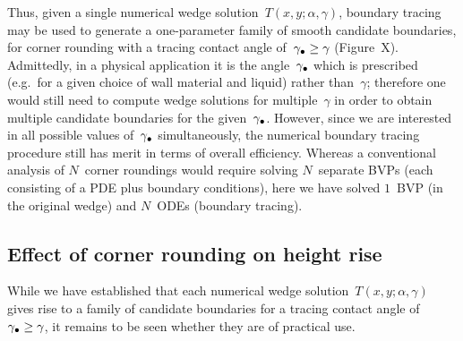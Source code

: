 Thus, given a single numerical wedge solution~$T (x, y; \alpha, \gamma)$,
boundary tracing may be used to generate a one-parameter family
of smooth candidate boundaries,
for corner rounding
with a tracing contact angle of~$\gamma_\bullet \ge \gamma$
(Figure~X). %
Admittedly, in a physical application
it is the angle~$\gamma_\bullet$ which is prescribed
(e.g.~for a given choice of wall material and liquid)
rather than~$\gamma$;
therefore one would still need to compute wedge solutions
for multiple~$\gamma$
in order to obtain multiple candidate boundaries
for the given~$\gamma_\bullet$.
However, since we are interested in
all possible values of~$\gamma_\bullet$ simultaneously,
the numerical boundary tracing procedure
still has merit in terms of overall efficiency.
Whereas a conventional analysis of $N$~corner roundings
would require solving $N$~separate BVPs
(each consisting of a PDE plus boundary conditions),
here we have solved $1$~BVP (in the original wedge)
and $N$~ODEs (boundary tracing).

\subsection{Effect of corner rounding on height rise}
\label{sec:moderate.multiple.effect}

While we have established that
each numerical wedge solution~$T (x, y; \alpha, \gamma)$
gives rise to a family of candidate boundaries
for a tracing contact angle of~$\gamma_\bullet \ge \gamma$,
it remains to be seen whether they are of practical use.

